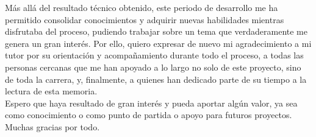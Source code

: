Más allá del resultado técnico obtenido, este periodo de desarrollo me ha permitido consolidar conocimientos y adquirir nuevas habilidades mientras disfrutaba del proceso, pudiendo trabajar sobre un tema que verdaderamente me genera un gran interés.
Por ello, quiero expresar de nuevo mi agradecimiento a mi tutor por su orientación y acompañamiento durante todo el proceso, a todas las personas cercanas que me han apoyado a lo largo no solo de este proyecto, sino de toda la carrera, y, finalmente, a quienes han dedicado parte de su tiempo a la lectura de esta memoria.\\

Espero que haya resultado de gran interés y pueda aportar algún valor, ya sea como conocimiento o como punto de partida o apoyo para futuros proyectos.\\

Muchas gracias por todo.

\newpage
\thispagestyle{plain}
\null
\newpage
